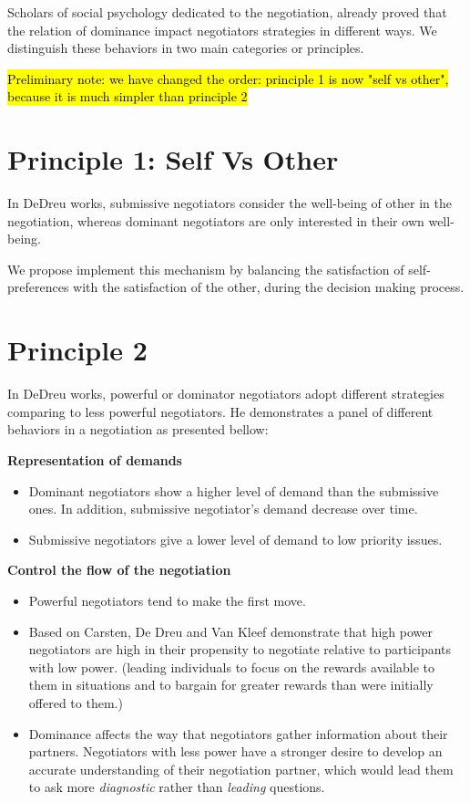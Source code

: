 \documentclass{article}
\begin{document}
\par Scholars of social psychology dedicated to the negotiation, already proved that the relation of dominance impact negotiators strategies in different ways. We distinguish these behaviors in two main categories or principles.

\hl{Preliminary note: we have changed the order: principle 1 is now "self vs other", because it is much simpler than principle 2}


\section{Principle 1: Self Vs Other}
In DeDreu works, submissive negotiators consider the well-being of other in the negotiation, whereas dominant negotiators are only interested in their own well-being. 

We propose implement this mechanism by balancing the satisfaction of self-preferences with the satisfaction of the other, during the decision making process.



\section{Principle 2}

In DeDreu works, powerful or dominator negotiators adopt different strategies comparing to less powerful negotiators. He demonstrates a panel of different behaviors in a negotiation as presented bellow:


\textbf{Representation of demands}
\begin{itemize}
	\item Dominant negotiators show a higher level of demand than the submissive ones. In addition, submissive negotiator's demand decrease over time. 
	\item Submissive negotiators give a lower level of demand to low priority issues.
\end{itemize} 



\textbf{Control the flow of the negotiation}
\begin{itemize}
	\item Powerful negotiators tend to make the first move. \cite{magee2007power}

	\item Based on Carsten, De Dreu and Van Kleef demonstrate that high power negotiators are high in their propensity to negotiate relative to participants with low power. (leading individuals to focus on the rewards available to them in situations and to bargain for	greater rewards than were initially offered to them.)

	\item Dominance affects the way that negotiators gather information about their partners. Negotiators with less power have a stronger desire to develop an accurate understanding of their negotiation partner, which would lead them to ask more \emph{diagnostic} rather than \emph{leading} questions.
	
\end{itemize} 




\vskip 4pt


\end{document}
